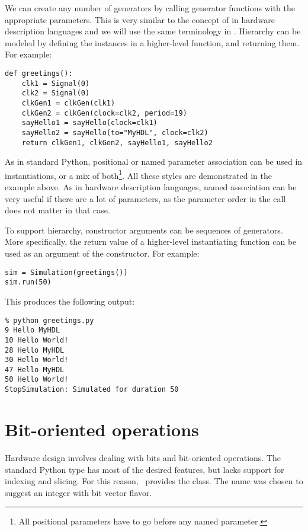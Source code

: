 We can create any number of generators by calling generator functions
with the appropriate parameters. This is very similar to the concept of
 in hardware description languages and we will use
the same terminology in \myhdl{}. Hierarchy can be modeled by defining
the instances in a higher-level function, and returning them. For
example: 

\begin{verbatim}
def greetings():
    clk1 = Signal(0)
    clk2 = Signal(0)
    clkGen1 = clkGen(clk1)
    clkGen2 = clkGen(clock=clk2, period=19)
    sayHello1 = sayHello(clock=clk1)
    sayHello2 = sayHello(to="MyHDL", clock=clk2)
    return clkGen1, clkGen2, sayHello1, sayHello2

\end{verbatim}
As in standard Python, positional or named parameter association can
be used in instantiations, or a mix of both\footnote{All positional
parameters have to go before any named parameter.}. All these styles
are demonstrated in the example above. As in hardware description
languages, named association can be very useful if there are a lot of
parameters, as the parameter order in the call does not matter in that
case.

To support hierarchy,  constructor arguments can be
sequences of generators. More specifically, the return value of a
higher-level instantiating function can be used as an argument of the
constructor. For example:

\begin{verbatim}
sim = Simulation(greetings())
sim.run(50)

\end{verbatim}

This produces the following output:

\begin{verbatim}
% python greetings.py
9 Hello MyHDL
10 Hello World!
28 Hello MyHDL
30 Hello World!
47 Hello MyHDL
50 Hello World!
StopSimulation: Simulated for duration 50

\end{verbatim}


\section{Bit-oriented operations}

Hardware design involves dealing with bits and bit-oriented
operations. The standard Python type  has most of the
desired features, but lacks support for indexing and slicing. For this
reason, \myhdl\ provides the  class. The name was chosen
to suggest an integer with bit vector flavor.

